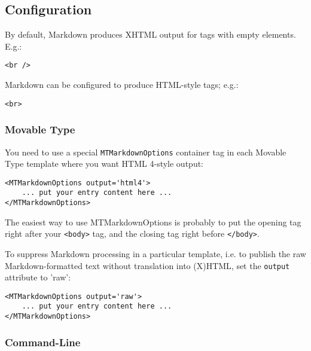 \subsection*{Configuration}




By default, Markdown produces XHTML output for tags with empty elements.
E.g.:

\begin{lstlisting}
<br />
\end{lstlisting}




Markdown can be configured to produce HTML-style tags; e.g.:

\begin{lstlisting}
<br>
\end{lstlisting}


\subsubsection*{Movable Type}




You need to use a special \texttt{MTMarkdownOptions} container tag in each
Movable Type template where you want HTML 4-style output:

\begin{lstlisting}
<MTMarkdownOptions output='html4'>
    ... put your entry content here ...
</MTMarkdownOptions>
\end{lstlisting}




The easiest way to use MTMarkdownOptions is probably to put the
opening tag right after your \texttt{<body>} tag, and the closing tag right
before \texttt{</body>}.



To suppress Markdown processing in a particular template, i.e. to
publish the raw Markdown-formatted text without translation into
(X)HTML, set the \texttt{output} attribute to 'raw':

\begin{lstlisting}
<MTMarkdownOptions output='raw'>
    ... put your entry content here ...
</MTMarkdownOptions>
\end{lstlisting}


\subsubsection*{Command-Line}





